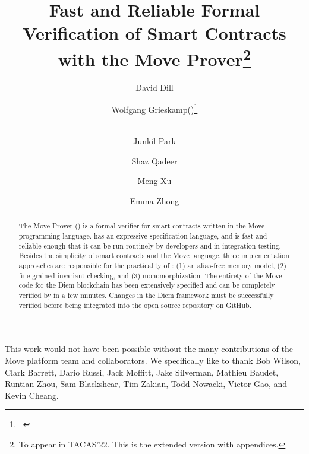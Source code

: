 \documentclass[runningheads,openbib]{llncs}
\begin{document}
\author{
  David Dill \and Wolfgang Grieskamp(\Envelope)\thanks{\mailname~} \and \\ Junkil
  Park \and Shaz Qadeer \and Meng Xu \and Emma Zhong
}


\title{Fast and Reliable Formal Verification of Smart Contracts with the Move
  Prover\thanks{To appear in TACAS'22. This is the extended version with
    appendices.}}

\maketitle
\begin{abstract}
  The Move Prover (\MVP) is a formal verifier for smart contracts written in the
  Move programming language. \MVP has an expressive specification language, and
  is fast and reliable enough that it can be run routinely by developers and in
  integration testing.  Besides the simplicity of smart contracts and the Move
  language, three implementation approaches are responsible for the practicality
  of \MVP: (1) an alias-free memory model, (2) fine-grained invariant checking,
  and (3) monomorphization.  The entirety of the Move code for the Diem
  blockchain has been extensively specified and can be completely verified by
  \MVP in a few minutes. Changes in the Diem framework must be successfully
  verified before being integrated into the open source repository on GitHub.
\end{abstract}









This work would not have been possible without the many contributions of the
Move platform team and collaborators.  We specifically like to thank Bob Wilson,
Clark Barrett, Dario Russi, Jack Moffitt, Jake Silverman, Mathieu Baudet,
Runtian Zhou, Sam Blackshear, Tim Zakian, Todd Nowacki, Victor Gao, and Kevin
Cheang.

\appendix
\newpage


\end{document}
